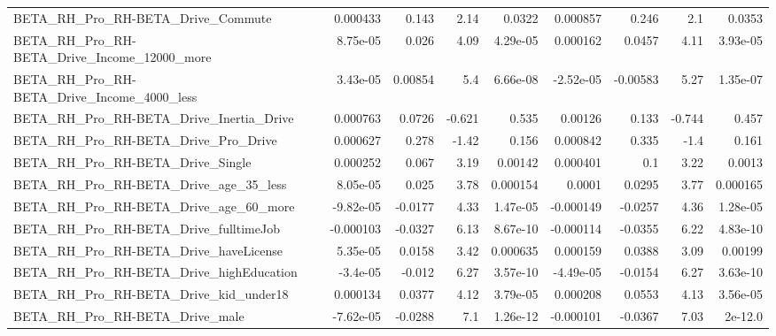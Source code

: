 \begin{tabular}{lrrrrrrrr}
BETA\_RH\_Pro\_RH-BETA\_Drive\_Commute                  &    0.000433 &        0.143 &     2.14 &   0.0322 &   0.000857 &       0.246 &          2.1 &        0.0353 \\
BETA\_RH\_Pro\_RH-BETA\_Drive\_Income\_12000\_more        &    8.75e-05 &        0.026 &     4.09 & 4.29e-05 &   0.000162 &      0.0457 &         4.11 &      3.93e-05 \\
BETA\_RH\_Pro\_RH-BETA\_Drive\_Income\_4000\_less         &    3.43e-05 &      0.00854 &      5.4 & 6.66e-08 &  -2.52e-05 &    -0.00583 &         5.27 &      1.35e-07 \\
BETA\_RH\_Pro\_RH-BETA\_Drive\_Inertia\_Drive            &    0.000763 &       0.0726 &   -0.621 &    0.535 &    0.00126 &       0.133 &       -0.744 &         0.457 \\
BETA\_RH\_Pro\_RH-BETA\_Drive\_Pro\_Drive                &    0.000627 &        0.278 &    -1.42 &    0.156 &   0.000842 &       0.335 &         -1.4 &         0.161 \\
BETA\_RH\_Pro\_RH-BETA\_Drive\_Single                   &    0.000252 &        0.067 &     3.19 &  0.00142 &   0.000401 &         0.1 &         3.22 &        0.0013 \\
BETA\_RH\_Pro\_RH-BETA\_Drive\_age\_35\_less              &    8.05e-05 &        0.025 &     3.78 & 0.000154 &     0.0001 &      0.0295 &         3.77 &      0.000165 \\
BETA\_RH\_Pro\_RH-BETA\_Drive\_age\_60\_more              &   -9.82e-05 &      -0.0177 &     4.33 & 1.47e-05 &  -0.000149 &     -0.0257 &         4.36 &      1.28e-05 \\
BETA\_RH\_Pro\_RH-BETA\_Drive\_fulltimeJob              &   -0.000103 &      -0.0327 &     6.13 & 8.67e-10 &  -0.000114 &     -0.0355 &         6.22 &      4.83e-10 \\
BETA\_RH\_Pro\_RH-BETA\_Drive\_haveLicense              &    5.35e-05 &       0.0158 &     3.42 & 0.000635 &   0.000159 &      0.0388 &         3.09 &       0.00199 \\
BETA\_RH\_Pro\_RH-BETA\_Drive\_highEducation            &    -3.4e-05 &       -0.012 &     6.27 & 3.57e-10 &  -4.49e-05 &     -0.0154 &         6.27 &      3.63e-10 \\
BETA\_RH\_Pro\_RH-BETA\_Drive\_kid\_under18              &    0.000134 &       0.0377 &     4.12 & 3.79e-05 &   0.000208 &      0.0553 &         4.13 &      3.56e-05 \\
BETA\_RH\_Pro\_RH-BETA\_Drive\_male                     &   -7.62e-05 &      -0.0288 &      7.1 & 1.26e-12 &  -0.000101 &     -0.0367 &         7.03 &       2e-12.0 \\

\end{tabular}

